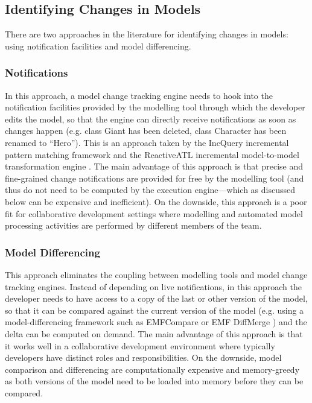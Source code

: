 \subsection{Identifying Changes in Models}
\label{sec:identifying_changes_in models}
There are two approaches in the literature for identifying changes in models: using notification facilities and model differencing.

\subsubsection{Notifications}
\label{sec:notifications}
In this approach, a model change tracking 
engine needs to hook into the notification facilities 
provided by the modelling tool through which the developer edits the model, 
so that the engine can directly receive notifications as soon as 
changes happen (e.g. class \textsf{Giant} has been deleted, class \textsf{Character} has been renamed to ``Hero''). 
This is an approach taken by the IncQuery incremental pattern matching 
framework \cite{DBLP:conf/ecmdafa/RathHV12} and the ReactiveATL incremental model-to-model 
transformation engine \cite{DBLP:conf/ecmdafa/OgunyomiRK15}. The main advantage of this 
approach is that precise and fine-grained change notifications are provided 
for free by the modelling tool (and thus do not need to be computed by the 
execution engine---which as discussed below can be expensive and inefficient). 
On the downside, this approach is a poor fit for collaborative development 
settings where modelling and automated model processing activities are 
performed by different members of the team.

\subsubsection{Model Differencing}
\label{sec:model_differencing}
  This approach eliminates the coupling between 
modelling tools and model change tracking engines. Instead of depending on 
live notifications, in this approach the developer needs to have access to a copy of the last or other version of the model, so that it can be compared against the current version of 
the model (e.g. using a model-differencing framework such as
EMFCompare\cite{emfcompare2018developer} or EMF DiffMerge \cite{eclipse2019emfdiffmerge}) and the delta can be computed on demand. The main advantage of 
this approach is that it works well in a collaborative development environment 
where typically developers have distinct roles and responsibilities. On the 
downside, model comparison and differencing are computationally expensive and 
memory-greedy as both versions of the model need to be loaded into memory before they can be compared.


